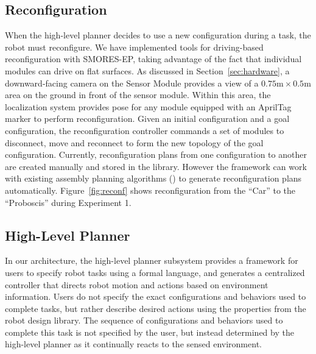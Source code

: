 \documentclass[12pt]{article}
\begin{document}

\subsection{Reconfiguration}
\label{sec:reconfiguration}
%
When the high-level planner decides to use a new configuration during a task, the robot must reconfigure.
We have implemented tools for driving-based reconfiguration with SMORES-EP, taking advantage of the fact that individual modules can drive on flat surfaces.
As discussed in Section~\ref{sec:hardware}, a downward-facing camera on the Sensor Module provides a view of a $0.75\text{m}\times0.5\text{m}$ area on the ground in front of the sensor module.  
Within this area, the localization system provides pose for any module equipped with an AprilTag marker to perform reconfiguration. 
Given an initial configuration and a goal configuration, the reconfiguration controller commands a set of modules to disconnect, move and reconnect to form the new topology of the goal configuration. 
Currently, reconfiguration plans from one configuration to another are created manually and stored in the library. However the framework can work with existing assembly planning algorithms (\cite{Werfel2007,Seo2013}) to generate reconfiguration plans automatically.
Figure~\ref{fig:reconf} shows reconfiguration from the ``Car'' to the ``Proboscis'' during Experiment 1.
%

\subsection{High-Level Planner}
\label{sec:high-level}

In our architecture, the high-level planner subsystem provides a framework for users to specify robot tasks using a formal language, and generates a centralized controller that directs robot motion and actions based on environment information.
Users do not specify the exact configurations and behaviors used to complete tasks, but rather describe desired actions using the properties from the robot design library.
The sequence of configurations and behaviors used to complete this task is not specified by the user, but instead determined by the high-level planner as it continually reacts to the sensed environment.
\end{document}
